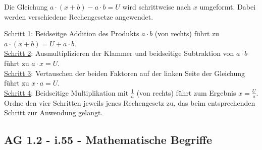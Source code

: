 \documentclass[a4paper,12pt]{article}
\begin{document}
\begin{beispiel}[AG 1.2]{1}
Die Gleichung $a\cdot (x+b)-a\cdot b=U$ wird schrittweise nach $x$ umgeformt. Dabei werden verschiedene Rechengesetze angewendet.

\underline{Schritt 1}: Beidseitge Addition des Produkts $a\cdot b$ (von rechts) führt zu $a\cdot (x+b)=U+a\cdot b$.\\ 
\underline{Schritt 2}: Ausmultiplizieren der Klammer und beidseitige Subtraktion von $a\cdot b$ führt zu $a\cdot x=U$.\\
\underline{Schritt 3}: Vertauschen der beiden Faktoren auf der linken Seite der Gleichung führt zu $x\cdot a=U$.\\
\underline{Schritt 4}: Beidseitige Multiplikation mit $\frac{1}{a}$ (von rechts) führt zum Ergebnis $x=\frac{U}{a}$.\\

Ordne den vier Schritten jeweils jenes Rechengesetz zu, das beim entsprechenden Schritt zur Anwendung gelangt.

\end{beispiel}


\newpage

\smallskip\begin{minipage}{1\textwidth}
\subsection{AG 1.2 - i.55 - Mathematische Begriffe}\smallskip

\end{minipage}
\end{document}
